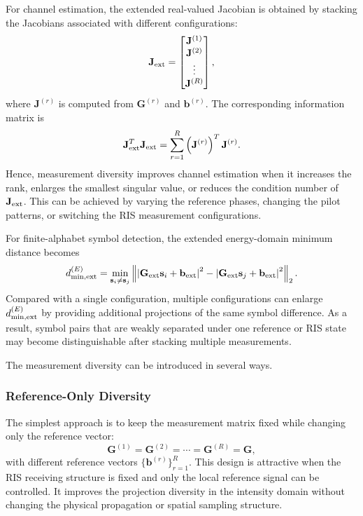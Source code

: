 \documentclass[journal]{IEEEtran}
\begin{document}
For channel estimation, the extended real-valued Jacobian is obtained by stacking the Jacobians associated with different configurations:
\begin{equation}
\mathbf{J}_{\rm ext}
=
\begin{bmatrix}
\mathbf{J}^{(1)}\\
\mathbf{J}^{(2)}\\
\vdots\\
\mathbf{J}^{(R)}
\end{bmatrix},
\label{eq:extended_jacobian}
\end{equation}
where $\mathbf{J}^{(r)}$ is computed from $\mathbf{G}^{(r)}$ and $\mathbf{b}^{(r)}$. 
The corresponding information matrix is
\begin{equation}
\mathbf{J}_{\rm ext}^T\mathbf{J}_{\rm ext}
=
\sum_{r=1}^{R}
\left(\mathbf{J}^{(r)}\right)^T
\mathbf{J}^{(r)}.
\label{eq:extended_information_matrix}
\end{equation}
Hence, measurement diversity improves channel estimation when it increases the rank, enlarges the smallest singular value, or reduces the condition number of $\mathbf{J}_{\rm ext}$. 
This can be achieved by varying the reference phases, changing the pilot patterns, or switching the RIS measurement configurations.

For finite-alphabet symbol detection, the extended energy-domain minimum distance becomes
\begin{equation}
d_{\min,{\rm ext}}^{(E)}
=
\min_{\mathbf{s}_i\neq\mathbf{s}_j}
\left\|
\left|
\mathbf{G}_{\rm ext}\mathbf{s}_i+
\mathbf{b}_{\rm ext}
\right|^2
-
\left|
\mathbf{G}_{\rm ext}\mathbf{s}_j+
\mathbf{b}_{\rm ext}
\right|^2
\right\|_2.
\label{eq:extended_dmin}
\end{equation}
Compared with a single configuration, multiple configurations can enlarge $d_{\min,{\rm ext}}^{(E)}$ by providing additional projections of the same symbol difference. 
As a result, symbol pairs that are weakly separated under one reference or RIS state may become distinguishable after stacking multiple measurements.

The measurement diversity can be introduced in several ways.

\subsubsection{Reference-Only Diversity}

The simplest approach is to keep the measurement matrix fixed while changing only the reference vector:
\begin{equation}
\mathbf{G}^{(1)}
=
\mathbf{G}^{(2)}
=
\cdots
=
\mathbf{G}^{(R)}
=
\mathbf{G},
\end{equation}
with different reference vectors $\{\mathbf{b}^{(r)}\}_{r=1}^{R}$. 
This design is attractive when the RIS receiving structure is fixed and only the local reference signal can be controlled. 
It improves the projection diversity in the intensity domain without changing the physical propagation or spatial sampling structure.
\end{document}
